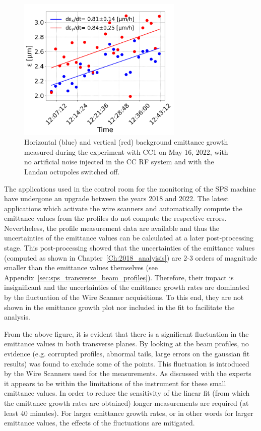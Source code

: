 \begin{figure}[!h] %
   \centering         
   \includegraphics[width=0.7\textwidth]{images/Ch8/cc_md_2022_background_in_scan.png}
       \caption{Horizontal (blue) and vertical (red) background emittance growth measured during the experiment with CC1 on May 16, 2022, with no artificial noise injected in the CC RF system and with the Landau octupoles switched off.}
       \label{fig:cc_md_2022_background_growth_in_scan}
\end{figure}

The applications used in the control room for the monitoring of the SPS machine have undergone an upgrade between the years 2018 and 2022. The latest applications which activate the wire scanners and automatically compute the emittance values from the profiles do not compute the respective errors. Nevertheless, the profile measurement data are available and thus the uncertainties of the emittance values can be calculated at a later post-processing stage. This post-processing showed that the uncertainties of the emittance values (computed as shown in Chapter~\ref{Ch:2018_analyisis}) are 2-3 orders of magnitude smaller than the emittance values themselves (see Appendix~\ref{sec:sps_transverse_beam_profiles}). Therefore, their impact is insignificant and the uncertainties of the emittance growth rates are dominated by the fluctuation of the Wire Scanner acquisitions. To this end, they are not shown in the emittance growth plot nor included in the fit to facilitate the analysis.

From the above figure, it is evident that there is a significant fluctuation in the emittance values in both transverse planes. By looking at the beam profiles, no evidence (e.g. corrupted profiles, abnormal tails, large errors on the gaussian fit results) was found to exclude some of the points. This fluctuation is introduced by the Wire Scanners used for the measurements. As discussed with the experts it appears to be within the limitations of the instrument for these small emittance values. In order to reduce the sensitivity of the linear fit (from which the emittance growth rates are obtained) longer measurements are required (at least 40 minutes). For larger emittance growth rates, or in other words for larger emittance values, the effects of the fluctuations are mitigated.

